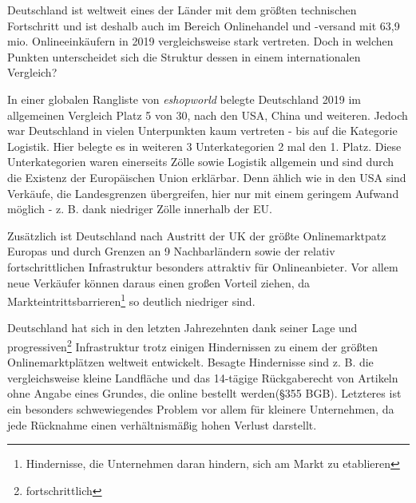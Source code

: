 \iffalse

    https://www.worldretailcongress.com/__media/Global_ecommerce_Market_Ranking_2019_001.pdf
    
    \cite{esworld} 

    name: globaler vergleich bezüglich des onlinehandels

\fi

Deutschland ist weltweit eines der Länder mit dem größten technischen Fortschritt und ist deshalb auch im Bereich Onlinehandel und -versand mit 63,9 mio. Onlineeinkäufern in 2019 vergleichsweise stark vertreten\cite[S. 8]{esworld}. Doch in welchen Punkten unterscheidet sich die Struktur dessen in einem internationalen Vergleich?

In einer globalen Rangliste von \emph{eshopworld} belegte Deutschland 2019 im allgemeinen Vergleich Platz 5 von 30, nach den USA, China und weiteren\cite[S. 3]{esworld}. Jedoch war Deutschland in vielen Unterpunkten kaum vertreten - bis auf die Kategorie Logistik. Hier belegte es in weiteren 3 Unterkategorien 2 mal den 1. Platz\cite[S. 10ff]{esworld}. Diese Unterkategorien waren einerseits Zölle sowie Logistik allgemein und sind durch die Existenz der Europäischen Union erklärbar. Denn ählich wie in den USA\cite[S. 4]{esworld} sind Verkäufe, die Landesgrenzen übergreifen, hier nur mit einem geringem Aufwand möglich - z. B. dank niedriger Zölle innerhalb der EU.%

Zusätzlich ist Deutschland nach Austritt der UK der größte Onlinemarktpatz Europas und durch Grenzen an 9 Nachbarländern sowie der relativ fortschrittlichen Infrastruktur besonders attraktiv für Onlineanbieter. Vor allem neue Verkäufer können daraus einen großen Vorteil ziehen, da Markteintrittsbarrieren\footnote{Hindernisse, die Unternehmen daran hindern, sich am Markt zu etablieren} so deutlich niedriger sind\cite[S. 8]{esworld}.

Deutschland hat sich in den letzten Jahrezehnten dank seiner Lage und progressiven\footnote{fortschrittlich} Infrastruktur trotz einigen Hindernissen zu einem der größten Onlinemarktplätzen weltweit entwickelt. Besagte Hindernisse sind z. B. die vergleichsweise kleine Landfläche und das 14-tägige Rückgaberecht von Artikeln ohne Angabe eines Grundes, die online bestellt werden(§355 BGB). Letzteres ist ein besonders schwewiegendes Problem vor allem für kleinere Unternehmen, da jede Rücknahme einen verhältnismäßig hohen Verlust darstellt\cite{retourwahnsinn}.
